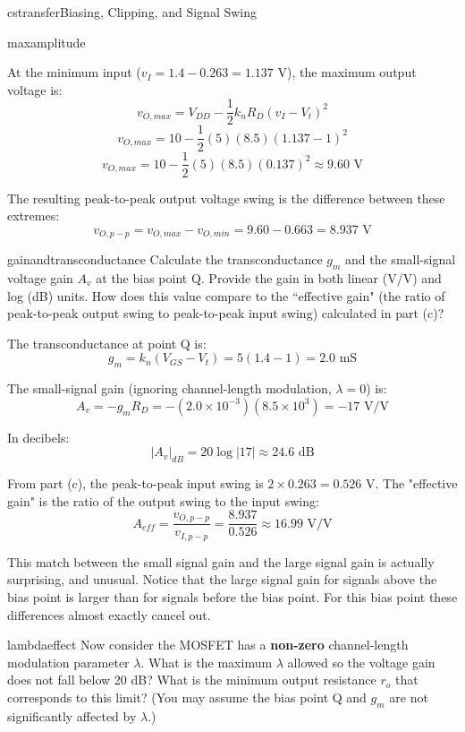 \begin{mainquestion}{cstransfer}{Biasing, Clipping, and Signal Swing}
\begin{partquestion}{maxamplitude}
\begin{answer}
        At the minimum input ($v_I = 1.4 - 0.263 = 1.137 \text{ V}$), the maximum output voltage is:
        \[v_{O,max} = V_{DD} - \frac{1}{2}k_n R_D (v_I - V_t)^2\]
        \[v_{O,max} = 10 - \frac{1}{2}(5)(8.5)(1.137 - 1)^2\]
        \[v_{O,max} = 10 - \frac{1}{2}(5)(8.5)(0.137)^2 \approx 9.60 \text{ V}\]
        
        The resulting peak-to-peak output voltage swing is the difference between these extremes:
        \[v_{O,p-p} = v_{O,max} - v_{O,min} = 9.60 - 0.663 = 8.937 \text{ V}\]
\end{answer}

\end{partquestion}

\begin{partquestion}{gainandtransconductance}
{Calculate the transconductance $g_m$ and the small-signal voltage gain $A_v$ at the bias point Q. Provide the gain in both linear (V/V) and log (dB) units. How does this value compare to the ``effective gain" (the ratio of peak-to-peak output swing to peak-to-peak input swing) calculated in part (c)?}

\begin{answer}
        The transconductance at point Q is:
        \[g_m = k_n(V_{GS} - V_t) = 5(1.4 - 1) = 2.0 \text{ mS}\]
        
        The small-signal gain (ignoring channel-length modulation, $\lambda = 0$) is:
        \[A_v = -g_m R_D = -(2.0 \times 10^{-3})(8.5 \times 10^3) = -17 \text{ V/V}\]
        
        In decibels:
        \[|A_v|_{dB} = 20 \log|17| \approx 24.6 \text{ dB}\]
        
        From part (c), the peak-to-peak input swing is $2 \times 0.263 = 0.526 \text{ V}$. 
        The "effective gain" is the ratio of the output swing to the input swing:
        \[A_{eff} = \frac{v_{O,p-p}}{v_{I,p-p}} = \frac{8.937}{0.526} \approx 16.99 \text{ V/V}\]
        
        This match between the small signal gain and the large signal gain is actually surprising, and unusual. Notice that the large signal gain for signals above the bias point is larger than for signals before the bias point. For this bias point these differences almost exactly cancel out. 
\end{answer}

\end{partquestion}

\begin{partquestion}{lambdaeffect}
{Now consider the MOSFET has a \textbf{non-zero} channel-length modulation parameter $\lambda$. What is the maximum $\lambda$ allowed so the voltage gain does not fall below 20 dB? What is the minimum output resistance $r_o$ that corresponds to this limit? (You may assume the bias point Q and $g_m$ are not significantly affected by $\lambda$.)}


\end{partquestion}
\end{mainquestion}
